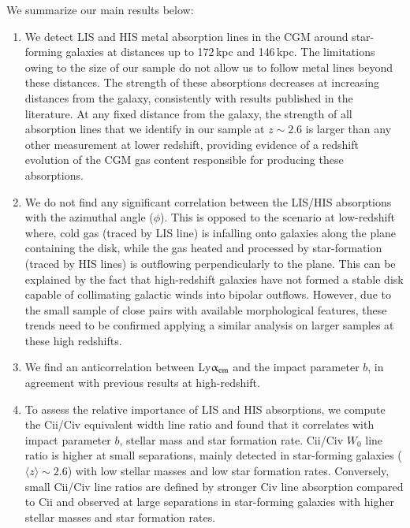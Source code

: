 \documentclass[longauth]{aa}
\begin{document}
We summarize our main results below:
   \begin{enumerate}
      \item We detect LIS and HIS metal absorption lines in the CGM around
       star-forming galaxies at distances up to 172\,kpc  and 146\,kpc.
       The limitations owing to the size of our sample do not
       allow us to follow metal lines beyond these distances. The strength of
       these absorptions decreases at increasing distances from the galaxy,
       consistently with results published in the literature. At any fixed
       distance from the galaxy, the strength of all absorption lines that we
       identify in our sample at $z \sim 2.6$ is larger than any other
       measurement at lower redshift, providing evidence of a redshift
       evolution of the CGM gas content responsible for producing these
       absorptions.
      \item We do not find any significant correlation between the LIS/HIS
       absorptions with the azimuthal angle ($\phi$). This is opposed to the
       scenario at low-redshift where, cold gas (traced by LIS line) is
       infalling onto galaxies along the plane containing the disk, while the
       gas heated and processed by star-formation (traced by HIS lines) is
       outflowing perpendicularly to the plane. This can be explained by the
       fact that high-redshift galaxies have not formed a stable disk capable
       of collimating galactic winds into bipolar outflows. However, due to
       the small sample of close pairs with available morphological features,
       these trends need to be confirmed applying a similar analysis on
       larger samples at these high redshifts.
      \item We find an anticorrelation between Ly$\upalpha_{\rm{em}}$ and the
       impact parameter $b$, in agreement with previous results at
       high-redshift. 
      \item To assess the relative importance of LIS and HIS absorptions, we
       compute the C{\sc ii}/C{\sc iv} equivalent width line ratio and found
       that it correlates with impact parameter $b$, stellar mass and star
       formation rate. C{\sc ii}/C{\sc iv} $W_{0}$ line ratio is higher at
       small separations, mainly detected in star-forming galaxies
       ($\langle z \rangle \sim 2.6$) with low stellar masses and low star
       formation rates. Conversely, small C{\sc ii}/C{\sc iv} line ratios are
       defined by stronger C{\sc iv} line absorption compared to C{\sc ii}
       and observed at large separations in star-forming galaxies with higher
       stellar masses and star formation rates.
   \end{enumerate}
\end{document}
